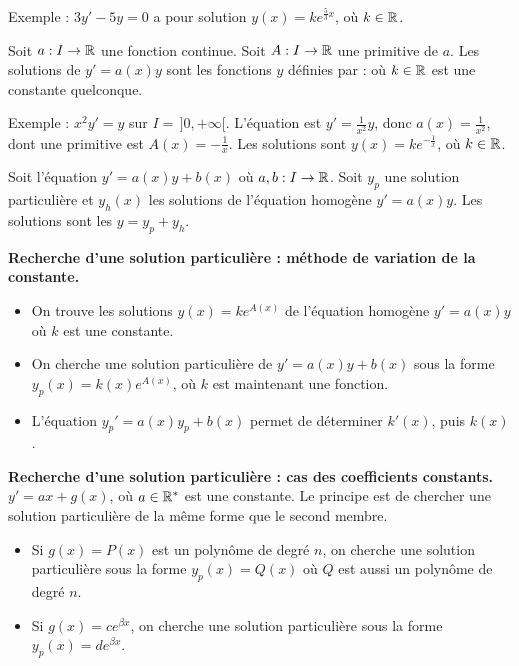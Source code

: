 \documentclass[10pt,class=article,crop=false]{standalone}
\begin{document}
\begin{multicols}{2}
Exemple : $3y' - 5y = 0$ a pour solution 
$y(x) = k e^{\frac53x}$, où $k \in \mathbb{R}$.


\begin{theoreme}[$y' = a(x) y$]
	\label{th:eqdifflinordre1}
	Soit $a : I \to \mathbb{R}$ une fonction continue. Soit $A : I \to \mathbb{R}$ une primitive de $a$. Les solutions de $y' = a(x) y$
	sont les fonctions $y$ définies par :
	où $k\in \mathbb{R}$ est une constante quelconque.
\end{theoreme}

Exemple : $x^2y'=y$ sur $I=\,]0,+\infty[$.
L'équation est $y'= \frac{1}{x^2}y$, donc $a(x)=\frac{1}{x^2}$, dont une primitive est $A(x)=-\frac1x$. Les solutions sont $y(x) = k e^{-\frac1x}$, où $k\in\mathbb{R}$.

\begin{theoreme}[$y' = a(x) y + b(x)$]
Soit l'équation $y' = a(x) y + b(x)$
où $a,b  : I \to \mathbb{R}$.
Soit $y_p$ une solution particulière et
$y_h(x)$ les solutions de l'équation homogène $y' = a(x) y$.
Les solutions sont les $y = y_p + y_h$.
\end{theoreme}




\textbf{Recherche d'une solution particulière : méthode de variation de la constante.}
\begin{itemize}
	\item On trouve les solutions $y(x)=ke^{A(x)}$ de l'équation homogène $y' = a(x) y$ où $k$ est une constante.
	\item On cherche une solution particulière de $y' = a(x) y + b(x)$
	sous la forme $y_p(x)=k(x)e^{A(x)}$, où $k$ est maintenant une fonction.
	\item L'équation $y_p' = a(x) y_p + b(x)$ permet de déterminer $k'(x)$, puis $k(x)$.
\end{itemize}

	
\textbf{Recherche d'une solution particulière : cas des coefficients constants.}
$y' = ax + g(x)$, où $a \in \mathbb{R}^*$ est une constante.
Le principe est de chercher une solution particulière de la même forme que le second membre.
\begin{itemize}
	\item Si $g(x) = P(x)$ est un polynôme de degré $n$, on cherche une solution particulière sous la forme $y_p(x) = Q(x)$ où $Q$ est aussi un polynôme de degré $n$.
	\item Si $g(x) = ce^{\beta x}$, on cherche une solution particulière sous la forme $y_p(x) =de^{\beta x}$.
	

\end{itemize}
\end{multicols}
\end{document}
